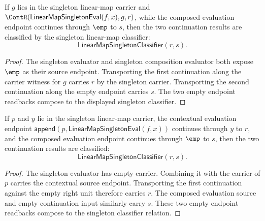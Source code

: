 \begin{theorem}
\label{thm:linearmap-singleton-eval-comp-continuation-pair-classifier}
If \(g\) lies in the singleton linear-map carrier and
\(\ContR(\mathsf{LinearMapSingletonEval}(f,x),g,r)\), while the composed
evaluation endpoint continues through \(\emp\) to \(s\), then the two
continuation results are classified by the singleton linear-map classifier:
$$
\mathsf{LinearMapSingletonClassifier}(r,s).
$$
\end{theorem}
\begin{proof}
The singleton evaluator and singleton composition evaluator both expose
\(\emp\) as their source endpoint. Transporting the first continuation along
the carrier witness for \(g\) carries \(r\) by the singleton carrier.
Transporting the second continuation along the empty endpoint carries \(s\).
The two empty endpoint readbacks compose to the displayed singleton
classifier.
\end{proof}

\begin{theorem}
\label{thm:linearmap-singleton-eval-context-comp-continuation-pair-classifier}
If \(p\) and \(y\) lie in the singleton linear-map carrier, the contextual
evaluation endpoint
\(\mathsf{append}(p,\mathsf{LinearMapSingletonEval}(f,x))\) continues through
\(y\) to \(r\), and the composed evaluation endpoint continues through
\(\emp\) to \(s\), then the two continuation results are classified:
$$
\mathsf{LinearMapSingletonClassifier}(r,s).
$$
\end{theorem}
\begin{proof}
The singleton evaluator has empty carrier. Combining it with the carrier of
\(p\) carries the contextual source endpoint. Transporting the first
continuation against the empty right unit therefore carries \(r\). The composed
evaluation source and empty continuation input similarly carry \(s\). These two
empty endpoint readbacks compose to the singleton classifier relation.
\end{proof}

